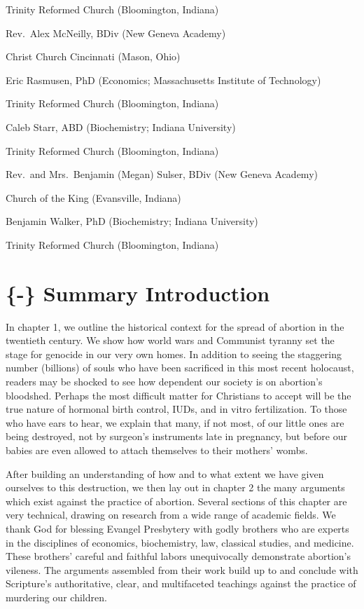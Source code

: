 \documentclass[
]{book}
\begin{document}
Trinity Reformed Church (Bloomington, Indiana)

Rev.~Alex McNeilly, BDiv (New Geneva Academy)

Christ Church Cincinnati (Mason, Ohio)

Eric Rasmusen, PhD (Economics; Massachusetts Institute of Technology)

Trinity Reformed Church (Bloomington, Indiana)

Caleb Starr, ABD (Biochemistry; Indiana University)

Trinity Reformed Church (Bloomington, Indiana)

Rev.~and Mrs.~Benjamin (Megan) Sulser, BDiv (New Geneva Academy)

Church of the King (Evansville, Indiana)

Benjamin Walker, PhD (Biochemistry; Indiana University)

Trinity Reformed Church (Bloomington, Indiana)

\hypertarget{summary-introduction}{%
\chapter{\{-\} Summary Introduction}\label{summary-introduction}}

In chapter 1, we outline the historical context for the spread of abortion in the twentieth century. We show how world wars and Communist tyranny set the stage for genocide in our very own homes. In addition to seeing the staggering number (billions) of souls who have been sacrificed in this most recent holocaust, readers may be shocked to see how dependent our society is on abortion's bloodshed. Perhaps the most difficult matter for Christians to accept will be the true nature of hormonal birth control, IUDs, and in vitro fertilization. To those who have ears to hear, we explain that many, if not most, of our little ones are being destroyed, not by surgeon's instruments late in pregnancy, but before our babies are even allowed to attach themselves to their mothers' wombs.

After building an understanding of how and to what extent we have given ourselves to this destruction, we then lay out in chapter 2 the many arguments which exist against the practice of abortion. Several sections of this chapter are very technical, drawing on research from a wide range of academic fields. We thank God for blessing Evangel Presbytery with godly brothers who are experts in the disciplines of economics, biochemistry, law, classical studies, and medicine. These brothers' careful and faithful labors unequivocally demonstrate abortion's vileness. The arguments assembled from their work build up to and conclude with Scripture's authoritative, clear, and multifaceted teachings against the practice of murdering our children.
\end{document}
